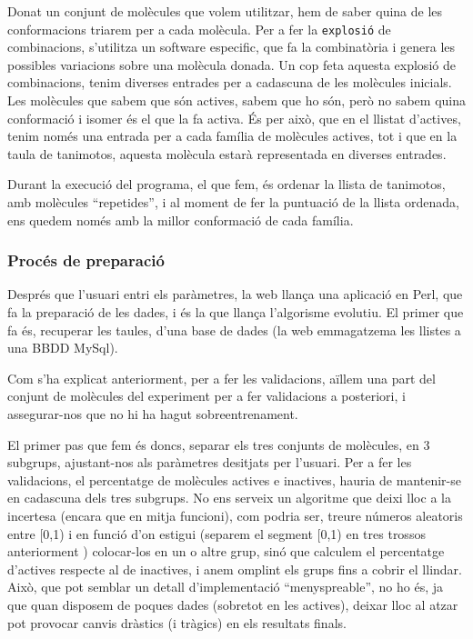 Donat un conjunt de molècules que volem utilitzar, hem de saber quina de les
conformacions triarem per a cada molècula.  Per a fer la \texttt{explosió} de
combinacions, s'utilitza un software especific, que fa la combinatòria i genera
les possibles variacions sobre una molècula donada.  Un cop feta aquesta
explosió de combinacions, tenim diverses entrades per a cadascuna de les
molècules inicials.  Les molècules que sabem que són actives, sabem que ho són,
però no sabem quina conformació i isomer és el que la fa activa.  És per això,
que en el llistat d'actives, tenim només una entrada per a cada família de
molècules actives, tot i que en la taula de tanimotos, aquesta molècula estarà
representada en diverses entrades. 

Durant la execució del programa, el que fem, és ordenar la llista de tanimotos,
amb molècules ``repetides'', i al moment de fer la puntuació de la llista
ordenada, ens quedem només amb la millor conformació de cada família.

\subsubsection{Procés de preparació} %
\label{ssub:Proces de preparacio}

Després que l'usuari entri els paràmetres, la web llança una aplicació en Perl,
que fa la preparació de les dades, i és la que llança l'algorisme evolutiu.  El
primer que fa és, recuperar les taules, d'una base de dades (la web emmagatzema
les llistes a una BBDD MySql).

Com s'ha explicat anteriorment, per a fer les validacions, aïllem una part del
conjunt de molècules del experiment per a fer validacions a posteriori, i
assegurar-nos que no hi ha hagut sobreentrenament.

El primer pas que fem és doncs, separar els tres conjunts de molècules, en 3
subgrups, ajustant-nos als paràmetres desitjats per l'usuari.  Per a fer les
validacions, el percentatge de molècules actives e inactives, hauria de
mantenir-se en cadascuna dels tres subgrups. No ens serveix un algoritme que
deixi lloc a la incertesa (encara que en mitja funcioni), com podria ser, treure
números aleatoris entre [0,1) i en funció d'on estigui (separem el segment [0,1)
en tres trossos anteriorment ) colocar-los en un o altre grup, sinó que calculem
el percentatge d'actives respecte al de inactives, i anem omplint els grups fins
a cobrir el llindar.  Això, que pot semblar un detall d'implementació
``menyspreable'', no ho és, ja que quan disposem de poques dades (sobretot en
les actives), deixar lloc al atzar pot provocar canvis dràstics (i tràgics) en
els resultats finals.

